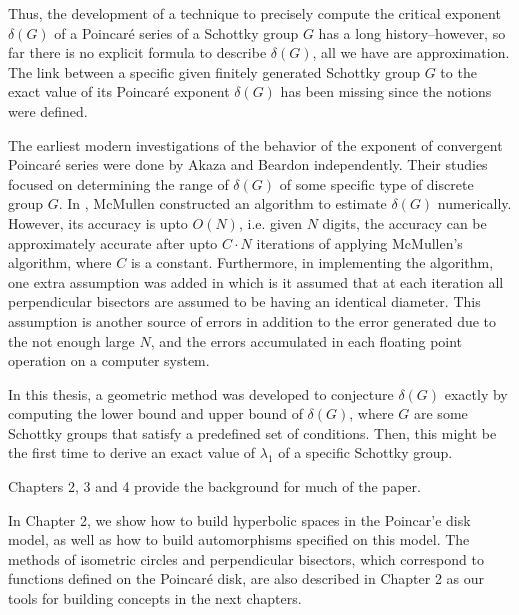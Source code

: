 \documentclass[12pt,oneside]{sfsuthesis}
\theoremstyle{plain} %
\theoremstyle{definition}  %
\theoremstyle{remark}  %
\theoremstyle{plain}
\begin{document}
{Thus, the development of a technique to precisely compute the critical exponent $\delta(G)$ of a Poincar\'{e} series of a Schottky group $G$ has a long history--however, so far there is no explicit formula to describe $\delta(G)$, all we have are approximation. The link between a specific given finitely generated Schottky group $G$ to the exact value of its Poincar\'{e} exponent $\delta(G)$ has been missing since the notions were defined. 


The earliest modern investigations of the behavior of the exponent of convergent Poincar\'{e} series were done by Akaza and Beardon independently\cite{akaza1964poincara, akaza1966singular, beardon1966hausdorff, beardon1968exponent, beardon1971inequalities}. Their studies focused on determining the range of $\delta(G)$ of some specific type of discrete group $G$. In \cite{mcmullen1998hausdorff}, McMullen constructed an algorithm to estimate $\delta(G)$ numerically. However, its accuracy is upto $O(N)$, i.e. given $N$ digits, the accuracy can be approximately accurate after upto $C\cdot N$ iterations of applying McMullen's algorithm, where $C$ is a constant. Furthermore, in implementing the algorithm, one extra assumption was added in \cite{mcmullen1998hausdorff} which is it assumed that at each iteration all perpendicular bisectors are assumed to be having an identical diameter. This assumption is another source of errors in addition to the error generated due to the not enough large $N$, and the errors accumulated in each floating point operation on a computer system.


In this thesis, a geometric method was developed to conjecture $\delta(G)$ exactly by computing the lower bound and upper bound of $\delta(G)$, where $G$ are some Schottky groups that satisfy a predefined set of conditions. Then, this might be the first time to derive an exact value of $\lambda_1$ of a specific Schottky group. 



Chapters 2, 3 and 4 provide the background for much of the paper. 

In Chapter 2, we show how to build hyperbolic spaces in the Poincar'e disk model, as well as how to build automorphisms specified on this model. The methods of isometric circles and perpendicular bisectors, which correspond to functions defined on the Poincar\'{e} disk, are also described in Chapter 2 as our tools for building concepts in the next chapters.


}
\end{document}
